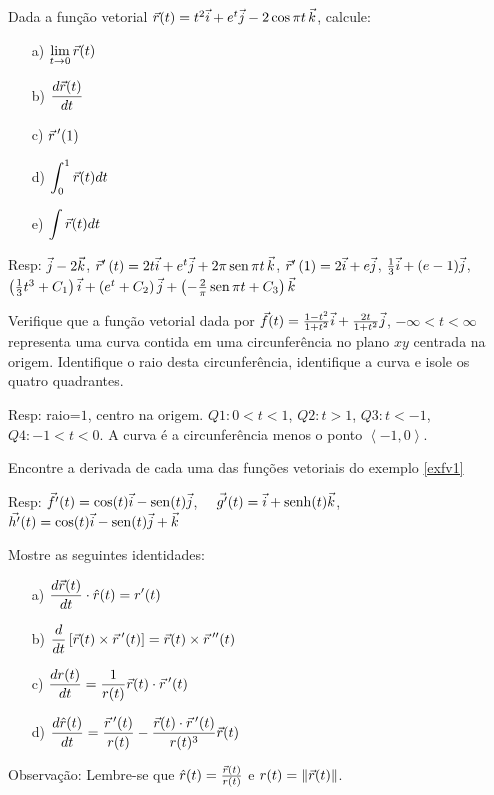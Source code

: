 \begin{exer} Dada a função vetorial $\vec{r}(t)=t^2\vec{i}+e^t\vec{j}-2\cos\pi t ~\! \vec{k}$, calcule:
\begin{itemize}
\item [a)] $\displaystyle \lim_{t\to 0} \vec{r}(t)$
\item [b)] $\displaystyle \frac{d \vec{r}(t)}{dt}$
\item [c)] $\displaystyle \vec{r}~\!'(1)$
\item [d)] $\displaystyle \int_0^1 \vec{r}(t)dt$
\item [e)] $\displaystyle \int \vec{r}(t)dt$
\end{itemize}
Resp: $\vec{j}-2\vec{k}$, $\vec{r}'\!~(t)=2t\vec{i}+e^t\vec{j}+2\pi\operatorname{sen}\pi t ~\! \vec{k}$, $\vec{r}'\!~(1)=2\vec{i}+e\vec{j}$, $\frac{1}{3}\vec{i}+(e-1)\vec{j}$, $\left(\frac{1}{3}t^3+C_1\right)\vec{i}+\left(e^t+C_2\right)\vec{j}+\left(-\frac{2}{\pi}\operatorname{sen}\pi t+C_3\right)\vec{k}$

\end{exer}

\begin{exer} Verifique que a função vetorial dada por $\vec{f}(t)=\frac{1-t^2}{1+t^2}\vec{i}+\frac{2t}{1+t^2}\vec{j}$, $-\infty<t<\infty$
representa uma curva contida em uma circunferência no plano $xy$  centrada na origem. Identifique o raio desta circunferência, identifique a curva e isole os quatro quadrantes.

Resp: raio=$1$, centro na origem. $Q1: 0<t<1$, $Q2:t>1$, $Q3:t<-1$, $Q4:-1<t<0$. A curva é a circunferência menos o ponto $\left<-1,0\right>$.

\end{exer}

\begin{exer}Encontre a derivada de cada uma das funções vetoriais do exemplo \ref{exfv1}

Resp: $\vec{f'}(t)=\cos(t)\vec{i}-\operatorname{sen}(t)\vec{j}$,~~ $\vec{g'}(t)= \vec{i}+\operatorname{senh}(t)\vec{k}$, ~~$\vec{h'}(t)=\cos(t)\vec{i}-\operatorname{sen}(t)\vec{j}+\vec{k}$

\end{exer}

\begin{exer} Mostre as seguintes identidades:
\begin{itemize}
\item[a)] $\displaystyle \frac{d\vec{r}(t)}{dt}\cdot \hat{r}(t)=r'(t)$
\item[b)] $\displaystyle \frac{d}{dt}\left[\vec{r}(t)\times\vec{r}~\!'(t)\right]=\vec{r}(t)\times\vec{r}~\!''(t)$
\item[c)] $\displaystyle \frac{d r(t)}{dt}=\frac{1}{r(t)} \vec{r}(t)\cdot\vec{r}~\!'(t)$
\item[d)] $\displaystyle \frac{d\hat{r}(t)}{dt}=\frac{\vec{r}~\!'(t)}{r(t)}-\frac{\vec{r}(t)\cdot\vec{r}~\!'(t)}{r(t)^3}\vec{r}(t)$
\end{itemize}
Observação: Lembre-se que $\hat{r}(t)=\frac{\vec{r}(t)}{r(t)}$ e $r(t)=\|\vec{r}(t)\|$.

\end{exer}

